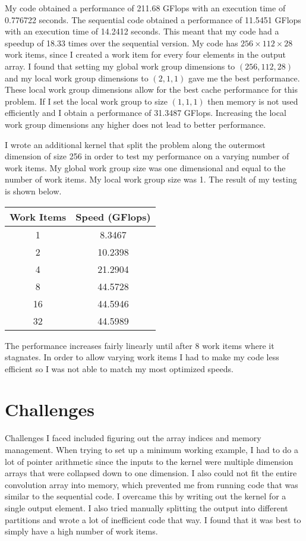 \documentclass[12pt]{article}
\begin{document}
My code obtained a performance of 211.68 GFlops with an execution time of 0.776722 seconds. The sequential code obtained a performance of
11.5451 GFlops with an execution time of 14.2412 seconds. This meant that my code had a speedup of 18.33 times over the sequential version.
My code has \(256\times112\times28\) work items, since I created a work item for every four elements in the output array. I found that
setting my global work group dimensions to \((256,112,28)\) and my local work group dimensions to \((2,1,1)\) gave me the best performance.
These local work group dimensions allow for the best cache performance for this problem. If I set the local work group to size \((1,1,1)\) then
memory is not used efficiently and I obtain a performance of 31.3487 GFlops. Increasing the local work group dimensions any higher does not lead
to better performance.

I wrote an additional kernel that split the problem along the outermost dimension of size 256
in order to test my performance on a varying number of work items. My global work group size was one dimensional and equal to the number of
work items. My local work group size was 1. The result of my testing is shown below.
\begin{center}
    \begin{tabular}{c|c}
        Work Items & Speed (GFlops)\\
        \hline
        1 & 8.3467\\
        2 & 10.2398\\
        4 & 21.2904\\
        8 & 44.5728\\
        16 & 44.5946\\
        32 & 44.5989
    \end{tabular}
\end{center}
The performance increases fairly linearly until after \(8\) work items where it stagnates. In order to allow varying work items I had to
make my code less efficient so I was not able to match my most optimized speeds.

\section{Challenges}

Challenges I faced included figuring out the array indices and memory management. When trying to set up a minimum working example, I had
to do a lot of pointer arithmetic since the inputs to the kernel were multiple dimension arrays that were collapsed down to one dimension.
I also could not fit the entire convolution array into memory, which prevented me from running code that was similar to the sequential code.
I overcame this by writing out the kernel for a single output element. I also tried  manually splitting the output into different partitions and wrote
a lot of inefficient code that way. I found that it was best to simply have a high number of work items.
\end{document}

